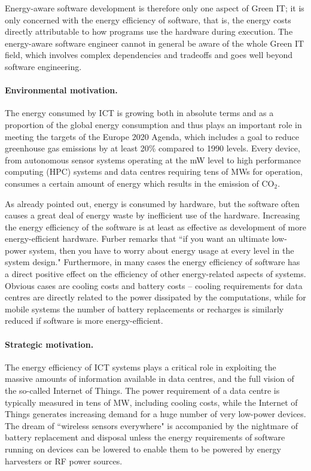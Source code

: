 \documentclass[oneside]{book}
\begin{document}
Energy-aware software development is therefore only one aspect of Green IT;  it is only concerned with the energy efficiency of software, that is, the energy costs directly attributable to how programs use the hardware during execution. The energy-aware software engineer cannot in general be aware of the whole Green IT field, which involves complex dependencies and tradeoffs and goes well beyond software engineering.



\paragraph{Environmental motivation.}
The energy consumed by ICT is growing both in absolute terms and as a proportion of the global energy consumption and thus plays an important role in meeting the targets of the Europe 2020 Agenda, which includes a goal to reduce greenhouse gas emissions by at least 20\% compared to 1990 levels.   Every device, from autonomous sensor systems operating at the mW level to high performance computing (HPC) systems and data centres requiring tens of MWs for operation, consumes a certain amount of energy which results in the emission of CO$_2$. 

As already pointed out, energy is consumed by hardware, but the software often causes a great deal of energy waste by inefficient use of the hardware.  Increasing the energy efficiency of the software is at least as effective as development of more energy-efficient hardware.
Furber \cite{Furber2016} remarks 
that ``if you want an ultimate low-power system, then you have to worry about
energy usage at every level in the system design."
Furthermore, in many cases the energy efficiency of software has a direct positive effect on the efficiency of other energy-related aspects of systems.  Obvious cases are cooling costs and battery costs -- cooling requirements for data centres are directly related to the power dissipated by the computations, while for mobile systems the number of battery replacements or recharges is similarly reduced if software is more energy-efficient.  

\paragraph{Strategic motivation.} 
The energy efficiency of ICT systems plays a critical role in exploiting the massive amounts of information available in data centres, and the full vision of the so-called Internet of Things.  The power requirement of a data centre is typically measured in tens of MW, including cooling costs, while the Internet of Things generates increasing demand for a huge number of very low-power devices. The dream of ``wireless sensors everywhere" is accompanied by the nightmare of battery replacement and disposal unless the energy requirements of software running on devices can be lowered to enable them to be powered by energy harvesters or RF power sources. 
\end{document}
